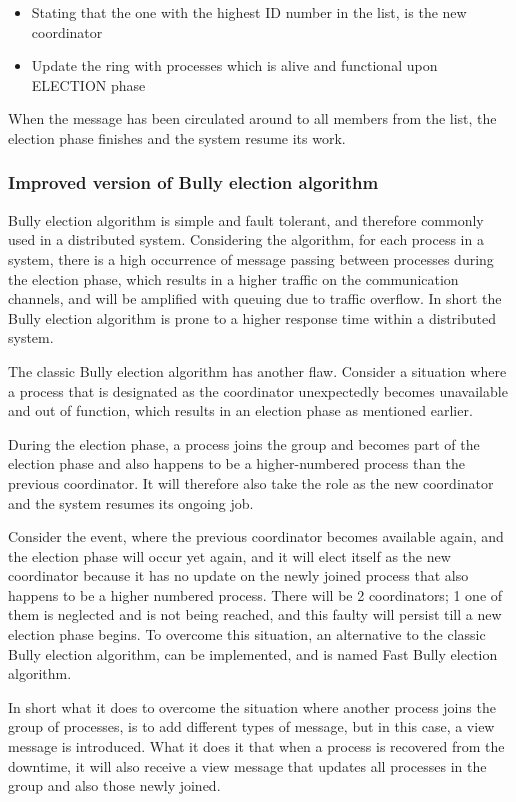 \begin{itemize}
  \item Stating that the one with the highest ID number in the list, is the new coordinator
  \item Update the ring with processes which is alive and functional upon ELECTION phase
\end{itemize}

When the message has been circulated around to all members from the list, the election phase finishes and the system resume its work.

\subsubsection{Improved version of Bully election algorithm}

Bully election algorithm is simple and fault tolerant, and therefore commonly used in a distributed system. Considering the algorithm, for each process in a system, there is a high occurrence of message passing between processes during the election phase, which results in a higher traffic on the communication channels, and will be amplified with queuing due to traffic overflow. In short the Bully election algorithm is prone to a higher response time within a distributed system.

The classic Bully election algorithm has another flaw. Consider a situation where a process that is designated as the coordinator unexpectedly becomes unavailable and out of function, which results in an election phase as mentioned earlier.

During the election phase, a process joins the group and becomes part of the election phase and also happens to be a higher-numbered process than the previous coordinator. It will therefore also take the role as the new coordinator and the system resumes its ongoing job. 

Consider the event, where the previous coordinator becomes available again, and the election phase will occur yet again, and it will elect itself as the new coordinator because it has no update on the newly joined process that also happens to be a higher numbered process. There will be 2 coordinators; 1 one of them is neglected and is not being reached, and this faulty will persist till a new election phase begins.
To overcome this situation, an alternative to the classic Bully election algorithm, can be implemented, and is named Fast Bully election algorithm.

In short what it does to overcome the situation where another process joins the group of processes, is to add different types of message, but in this case, a view message is introduced.
What it does it that when a process is recovered from the downtime, it will also receive a view message that updates all processes in the group and also those newly joined. 

